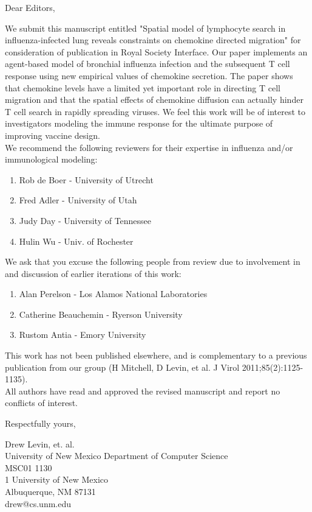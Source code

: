 \documentclass[10pt]{article}
\date{}
\begin{document}
\begin{flushleft}Dear Editors, \end{flushleft} 

We submit this manuscript entitled "Spatial model of lymphocyte search in influenza-infected lung reveals constraints on chemokine directed migration" for consideration of publication in Royal Society Interface.  Our paper implements an agent-based model of bronchial influenza infection and the subsequent T cell response using new empirical values of chemokine secretion.  The paper shows that chemokine levels have a limited yet important role in directing T cell migration and that the spatial effects of chemokine diffusion can actually hinder T cell search in rapidly spreading viruses.  We feel this work will be of interest to investigators modeling the immune response for the ultimate purpose of improving vaccine design.
 \\

We recommend the following reviewers for their expertise in influenza and/or immunological modeling:
\begin{enumerate}
\item Rob de Boer - University of Utrecht
\item Fred Adler - University of Utah
\item Judy Day - University of Tennessee
\item Hulin Wu - Univ. of Rochester
\end{enumerate}

We ask that you excuse the following people from review due to involvement in and discussion of earlier iterations of this work:
\begin{enumerate}
\item Alan Perelson - Los Alamos National Laboratories 
\item Catherine Beauchemin - Ryerson University
\item Rustom Antia - Emory University
\end{enumerate}

This work has not been published elsewhere, and is complementary to a previous publication from our group (H Mitchell, D Levin, et al. J Virol 2011;85(2):1125-1135). \\



All authors have read and approved the revised manuscript and report no conflicts of interest. 

\begin{flushleft}Respectfully yours,\end{flushleft} 

\noindent Drew Levin, et. al. \\
University of New Mexico Department of Computer Science \\
MSC01 1130 \\
1 University of New Mexico \\
Albuquerque, NM 87131 \\
drew@cs.unm.edu
\end{document}
